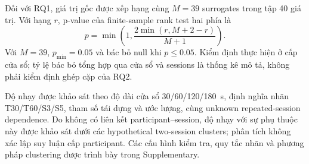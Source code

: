 Đối với RQ1, giá trị gốc được xếp hạng cùng $M=39$ surrogates trong tập 40 giá trị. Với hạng $r$, p-value của finite-sample rank test hai phía là
\begin{equation}
p=\min\left(1,\frac{2\min(r,M+2-r)}{M+1}\right).
\label{eq:pps_rank_test}
\end{equation}
Với $M=39$, $p_{\min}=0.05$ và bác bỏ null khi $p\leq0.05$. Kiểm định thực hiện ở cấp cửa sổ; tỷ lệ bác bỏ tổng hợp qua cửa sổ và sessions là thống kê mô tả, không phải kiểm định ghép cặp của RQ2.

Độ nhạy được khảo sát theo độ dài cửa sổ 30/60/120/180~s, định nghĩa nhãn T30/T60/S3/S5, tham số tái dựng và ước lượng, cùng unknown repeated-session dependence. Do không có liên kết participant--session, độ nhạy với sự phụ thuộc này được khảo sát dưới các hypothetical two-session clusters; phân tích không xác lập suy luận cấp participant. Các cấu hình kiểm tra, quy tắc nhãn và phương pháp clustering được trình bày trong Supplementary.
